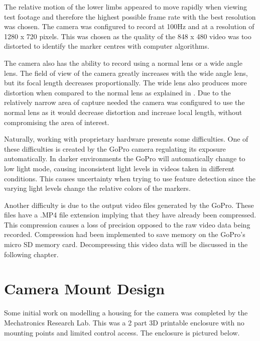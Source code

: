 The relative motion of the lower limbs appeared to move rapidly when viewing test footage and therefore the highest possible frame rate with the best resolution was chosen. The camera was configured to record at 100Hz and at a resolution of 1280 x 720 pixels. This was chosen as the quality of the 848 x 480 video was too distorted to identify the marker centres with computer algorithms.

The camera also has the ability to record using a normal lens or a wide angle lens. The field of view of the camera greatly increases with the wide angle lens, but its focal length decreases proportionally. The wide lens also produces more distortion when compared to the normal lens as explained in \cite{Hartley2004}. Due to the relatively narrow area of capture needed the camera was configured to use the normal lens as it would decrease distortion and increase local length, without compromising the area of interest.

Naturally, working with proprietary hardware presents some difficulties. One of these difficulties is created by the GoPro camera regulating its exposure automatically. In darker environments the GoPro will automatically change to low light mode, causing inconsistent light levels in videos taken in different conditions. This causes uncertainty when trying to use feature detection since the varying light levels change the relative colors of the markers.

Another difficulty is due to the output video files generated by the GoPro. These files have a .MP4 file extension implying that they have already been compressed. This compression causes a loss of precision opposed to the raw video data being recorded. Compression had been implemented to save memory on the GoPro's micro SD memory card. Decompressing this video data will be discussed in the following chapter.

\section{Camera Mount Design}
Some initial work on modelling a housing for the camera was completed by the Mechatronics Research Lab. This was a 2 part 3D printable enclosure with no mounting points and limited control access. The enclosure is pictured below.

